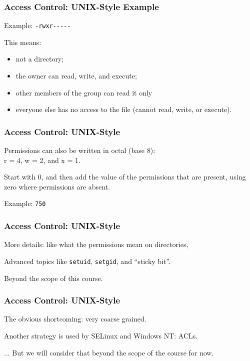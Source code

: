 \begin{frame}
	\frametitle{Access Control: UNIX-Style Example}


	Example: \texttt{-rwxr{-}{-}{-}{-}{-}}

	This means:
	\begin{itemize}
		\item not a directory;
		\item the owner can read, write, and execute;
		\item other members of the group can read it only
		\item everyone else has no access to the file (cannot read, write, or execute).
	\end{itemize}


\end{frame}

\begin{frame}
	\frametitle{Access Control: UNIX-Style}


	Permissions can also be written in octal (base 8): \\
	\quad r = 4, w = 2, and x = 1.

	Start with 0, and then add the value of the  permissions that are present, using zero where permissions are absent.

	Example: \texttt{750} 


\end{frame}

\begin{frame}
	\frametitle{Access Control: UNIX-Style}


	More details: like what the permissions mean on directories,

	Advanced topics like \texttt{setuid}, \texttt{setgid}, and ``sticky bit''.

	Beyond the scope of this course.


\end{frame}

\begin{frame}
	\frametitle{Access Control: UNIX-Style}


	The obvious shortcoming: very coarse grained.

	Another strategy is used by SELinux and Windows NT: ACLs.

	... But we will consider that beyond the scope of the course for now.
\end{frame}



